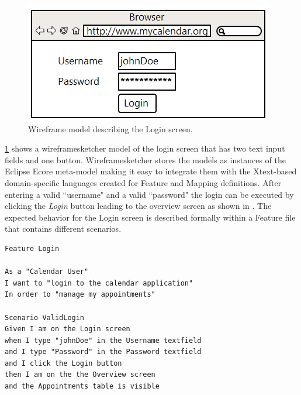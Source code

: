 \documentclass{sig-alternate-05-2015}
\begin{document}
\begin{figure}[h]
	\centering
	\includegraphics[width=0.8\linewidth]{Login.png}
	\caption{Wireframe model describing the Login screen.}
	\label{fig:login}
\end{figure}

\cref{fig:login} shows a wireframesketcher model of the login screen that has two text input fields and one button.
Wireframesketcher stores the models as instances of the Eclipse Ecore meta-model making it easy to integrate them with the Xtext-based domain-specific languages created for Feature and Mapping definitions.
After entering a valid ``username" and a valid ``password" the login can be executed by clicking the \textit{Login} button leading to the overview screen as shown in .
The expected behavior for the Login screen is described formally within a Feature file that contains different scenarios.

\begin{lstlisting}[captionpos=b, caption=Feature Description: Login Screen., label={lst:featureLogin}, language=dsl]
Feature Login

As a "Calendar User"
I want to "login to the calendar application"
In order to "manage my appointments"

Scenario ValidLogin
Given I am on the Login screen 
when I type "johnDoe" in the Username textfield 
and I type "Password" in the Password textfield 
and I click the Login button
then I am on the the Overview screen
and the Appointments table is visible
\end{lstlisting}
\end{document}
